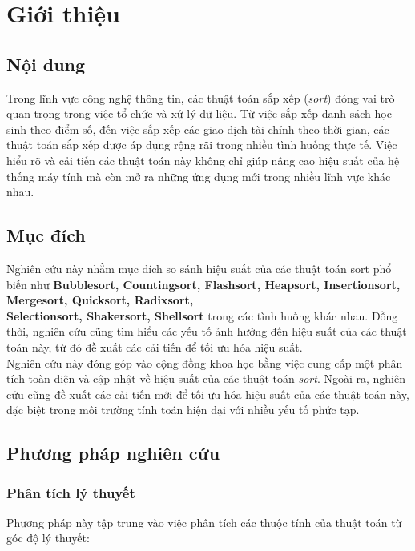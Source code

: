 \section{Giới thiệu}

\subsection{Nội dung}
Trong lĩnh vực công nghệ thông tin, các thuật toán sắp xếp (\textit{sort}) đóng vai trò quan trọng trong việc tổ chức và xử lý dữ liệu. Từ việc sắp xếp danh sách học sinh theo điểm số, đến việc sắp xếp các giao dịch tài chính theo thời gian, các thuật toán sắp xếp được áp dụng rộng rãi trong nhiều tình huống thực tế. Việc hiểu rõ và cải tiến các thuật toán này không chỉ giúp nâng cao hiệu suất của hệ thống máy tính mà còn mở ra những ứng dụng mới trong nhiều lĩnh vực khác nhau.
\subsection{Mục đích}
Nghiên cứu này nhằm mục đích so sánh hiệu suất của các thuật toán sort phổ biến như \textbf{Bubblesort, Countingsort, Flashsort, Heapsort, Insertionsort, Mergesort, Quicksort, Radixsort,\\ Selectionsort, Shakersort, Shellsort} trong các tình huống khác nhau. Đồng thời, nghiên cứu cũng tìm hiểu các yếu tố ảnh hưởng đến hiệu suất của các thuật toán này, từ đó đề xuất các cải tiến để tối ưu hóa hiệu suất.\\
Nghiên cứu này đóng góp vào cộng đồng khoa học bằng việc cung cấp một phân tích toàn diện và cập nhật về hiệu suất của các thuật toán \textit{sort}. Ngoài ra, nghiên cứu cũng đề xuất các cải tiến mới để tối ưu hóa hiệu suất của các thuật toán này, đặc biệt trong môi trường tính toán hiện đại với nhiều yếu tố phức tạp.

\subsection{Phương pháp nghiên cứu}

\subsubsection{Phân tích lý thuyết}
Phương pháp này tập trung vào việc phân tích các thuộc tính của thuật toán từ góc độ lý thuyết:

